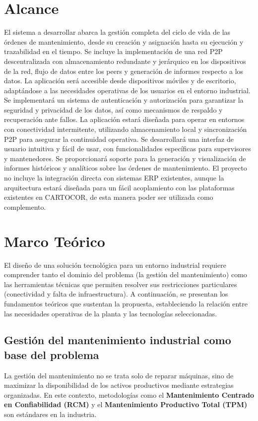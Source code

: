 \documentclass[10pt,a4paper]{report}
\begin{document}
\chapter*{Alcance}
El sistema a desarrollar abarca la gestión completa del ciclo de vida de las órdenes de mantenimiento, desde su creación y asignación hasta su ejecución y trazabilidad en el tiempo. Se incluye la implementación de una red P2P descentralizada con almacenamiento redundante y jerárquico en los dispositivos de la red, flujo de datos entre los peers y generación de informes respecto a los datos. La aplicación será accesible desde dispositivos móviles y de escritorio, adaptándose a las necesidades operativas de los usuarios en el entorno industrial. Se implementará un sistema de autenticación y autorización para garantizar la seguridad y privacidad de los datos, así como mecanismos de respaldo y recuperación ante fallos.  La aplicación estará diseñada para operar en entornos con conectividad intermitente, utilizando almacenamiento local y sincronización P2P para asegurar la continuidad operativa. Se desarrollará una interfaz de usuario intuitiva y fácil de usar, con funcionalidades específicas para supervisores y mantenedores. Se proporcionará soporte para la generación y visualización de informes históricos y analíticos sobre las órdenes de mantenimiento.
\newline
El proyecto no incluye la integración directa con sistemas ERP existentes, aunque la arquitectura estará diseñada para un fácil acoplamiento con las plataformas existentes en CARTOCOR, de esta manera poder ser utilizada como complemento.

\chapter*{Marco Teórico}

El diseño de una solución tecnológica para un entorno industrial requiere comprender tanto el dominio del problema (la gestión del mantenimiento) como las herramientas técnicas que permiten resolver sus restricciones particulares (conectividad y falta de infraestructura). A continuación, se presentan los fundamentos teóricos que sustentan la propuesta, estableciendo la relación entre las necesidades operativas de la planta y las tecnologías seleccionadas.

\section*{Gestión del mantenimiento industrial como base del problema}
La gestión del mantenimiento no se trata solo de reparar máquinas, sino de maximizar la disponibilidad de los activos productivos mediante estrategias organizadas. En este contexto, metodologías como el \textbf{Mantenimiento Centrado en Confiabilidad (RCM)} y el \textbf{Mantenimiento Productivo Total (TPM)} son estándares en la industria.
\end{document}

